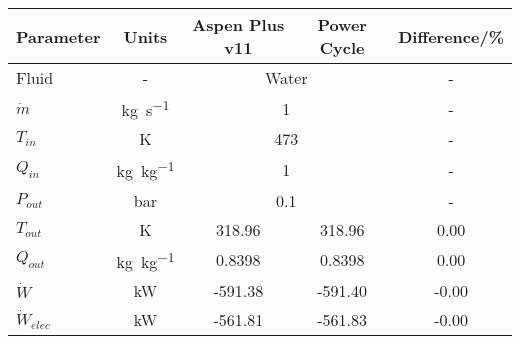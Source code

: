 \begin{tabular}{|p{2.5cm} c c c c|}
    \hline
    \rowcolor{bluepoli!40} %
    \textbf{Parameter} & \textbf{Units} & \textbf{Aspen Plus v11} & \textbf{Power Cycle} & \textbf{Difference/\unit{\percent}} \T\B \\
    \hline \hline
    Fluid & - & \multicolumn{2}{c}{Water} & - \T\B\\
    \(\Dot{m}\)  & \unit{\kg\per\s} & \multicolumn{2}{c}{\num{1}} & - \T\B\\
    \(T_{in}\) & \unit{\K} & \multicolumn{2}{c}{\num{473}} & - \T\B\\
    \(Q_{in}\) & \unit{\kg\per\kg} & \multicolumn{2}{c}{\num{1}} & - \T\B\\
    \(P_{out}\) & \unit{\bar} & \multicolumn{2}{c}{\num{0.1}} & - \T\B\\
    \hline\hline
    \(T_{out}\) & \unit{\K} & 318.96 & 318.96 & 0.00 \T\B\\
    \(Q_{out}\) & \unit{\kg\per\kg} & 0.8398 & 0.8398 & 0.00 \T\B\\
    \(\Dot{W}\) & \unit{\kilo\watt} & -591.38 & -591.40 & -0.00 \T\B\\
    \(\Dot{W}_{elec}\) & \unit{\kilo\watt} & -561.81 & -561.83 & -0.00 \T\B\\
    \hline
\end{tabular}